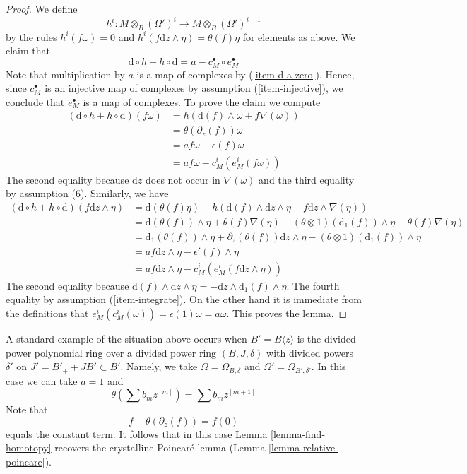 \begin{proof}
\medskip\noindent
We define
$$
h^i : M \otimes_B (\Omega')^i \longrightarrow M \otimes_B (\Omega')^{i - 1}
$$
by the rules $h^i(f \omega) = 0$ and
$h^i(f \text{d}z \wedge \eta) = \theta(f) \eta$
for elements as above.  We claim that
$$
\text{d} \circ h + h \circ \text{d} = a - c_M^\bullet \circ e_M^\bullet
$$
Note that multiplication by $a$ is a map of complexes
by (\ref{item-d-a-zero}). Hence, since $c_M^\bullet$ is an injective map
of complexes by assumption (\ref{item-injective}), we conclude that
$e_M^\bullet$ is a map of complexes. To prove the claim we compute
\begin{align*}
(\text{d} \circ h + h \circ \text{d})(f \omega)
& =
h\left(\text{d}(f) \wedge \omega + f \nabla(\omega)\right)
\\
& =
\theta(\partial_z(f)) \omega
\\
& =
a f\omega - \epsilon(f)\omega 
\\
& =
a f \omega - c^i_M(e^i_M(f\omega))
\end{align*}
The second equality because $\text{d}z$ does not occur in $\nabla(\omega)$
and the third equality by assumption (6). Similarly, we have
\begin{align*}
(\text{d} \circ h + h \circ \text{d})(f \text{d}z \wedge \eta)
& =
\text{d}(\theta(f) \eta) +
h\left(\text{d}(f) \wedge \text{d}z \wedge \eta -
f \text{d}z \wedge \nabla(\eta)\right)
\\
& =
\text{d}(\theta(f)) \wedge \eta + \theta(f) \nabla(\eta)
- (\theta \otimes 1)(\text{d}_1(f)) \wedge \eta
- \theta(f) \nabla(\eta)
\\
& =
\text{d}_1(\theta(f)) \wedge \eta +
\partial_z(\theta(f)) \text{d}z \wedge \eta -
(\theta \otimes 1)(\text{d}_1(f)) \wedge \eta
\\
& =
a f \text{d}z \wedge \eta - \epsilon'(f) \wedge \eta \\
& = a f \text{d}z \wedge \eta - c^i_M(e^i_M(f \text{d}z \wedge \eta))
\end{align*}
The second equality because
$\text{d}(f) \wedge \text{d}z \wedge \eta =
- \text{d}z \wedge \text{d}_1(f) \wedge \eta$.
The fourth equality by assumption (\ref{item-integrate}).
On the other hand it is immediate from the definitions
that $e^i_M(c^i_M(\omega)) = \epsilon(1) \omega = a \omega$.
This proves the lemma.
\end{proof}

\begin{example}
\label{example-integrate}
A standard example of the situation above occurs when
$B' = B\langle z \rangle$ is the divided power polynomial ring
over a divided power ring $(B, J, \delta)$ with divided powers
$\delta'$ on $J' = B'_{+} + JB' \subset B'$. Namely, we take
$\Omega = \Omega_{B, \delta}$ and $\Omega' = \Omega_{B', \delta'}$.
In this case we can take $a = 1$ and
$$
\theta( \sum b_m z^{[m]} ) = \sum b_m z^{[m + 1]}
$$
Note that
$$
f - \theta(\partial_z(f)) = f(0)
$$
equals the constant term. It follows that in this case
Lemma \ref{lemma-find-homotopy}
recovers the crystalline Poincar\'e lemma
(Lemma \ref{lemma-relative-poincare}).
\end{example}


